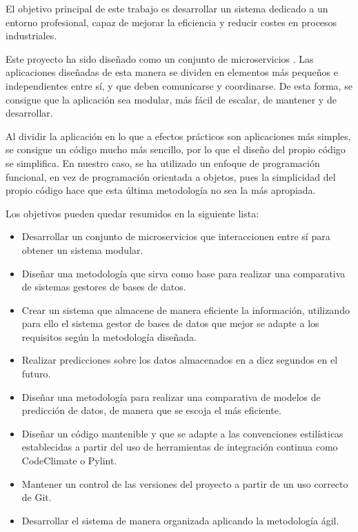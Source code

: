 
El objetivo principal de este trabajo es desarrollar un sistema dedicado a un entorno profesional, capaz 
de mejorar la eficiencia y reducir costes en procesos industriales. %

Este proyecto ha sido diseñado como un conjunto de microservicios \cite{7030212}. Las aplicaciones diseñadas de esta manera se dividen 
en elementos más pequeños e independientes entre sí, y que deben comunicarse y coordinarse. De esta 
forma, se consigue que la aplicación sea modular, más fácil de escalar, de mantener y de desarrollar.

Al dividir la aplicación en lo que a efectos prácticos son aplicaciones más simples, se consigue un código 
mucho más sencillo, por lo que el diseño del propio código se simplifica. En nuestro caso, se ha utilizado 
un enfoque de programación funcional, en vez de programación orientada a objetos, pues la simplicidad del propio 
código hace que esta última metodología no sea la más apropiada.

Los objetivos pueden quedar resumidos en la siguiente lista:
\begin{itemize}
    \item Desarrollar un conjunto de microservicios que interaccionen entre sí para obtener un sistema modular.
    \item Diseñar una metodología que sirva como base para realizar una comparativa de sistemas gestores de bases de datos.
    \item Crear un sistema que almacene de manera eficiente la información, utilizando para ello el sistema gestor de bases 
        de datos que mejor se adapte a los requisitos según la metodología diseñada.
    \item Realizar predicciones sobre los datos almacenados en a diez segundos en el futuro.
    \item Diseñar una metodología para realizar una comparativa de modelos de predicción de datos, de manera que se escoja el 
        más eficiente.
    \item Diseñar un código mantenible y que se adapte a las convenciones estilísticas establecidas a partir del uso de
        herramientas de integración continua como CodeClimate o Pylint.
    \item Mantener un control de las versiones del proyecto a partir de un uso correcto de Git.
    \item Desarrollar el sistema de manera organizada aplicando la metodología ágil.
\end{itemize}